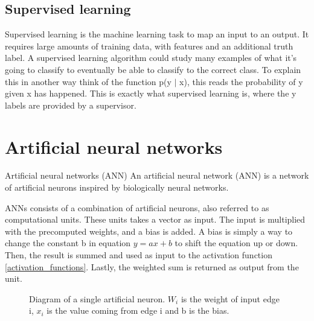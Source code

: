 \subsection{Supervised learning}
\label{supervised_learning}

Supervised learning is the machine learning task to map an input to an output. It requires large amounts of training data, with features and an additional truth label. 
A supervised learning algorithm could study many examples of what it's going to classify to eventually be able to classify to the correct class. To explain this in another way think of the function p(y $|$ x), this reads the probability of y given x has happened. This is exactly what supervised learning is, where the y labels are provided by a supervisor.

\section{Artificial neural networks}
\label{artificial_neural_networks}

Artificial neural networks (ANN) 
An artificial neural network (ANN) is a network of artificial neurons inspired by biologically neural networks.

ANNs consists of a combination of artificial neurons, also referred to as computational units. These units takes a vector as input. The input is multiplied with the precomputed weights, and a bias is added. A bias is simply a way to change the constant b in equation $y = ax + b$ to shift the equation up or down. Then, the result is summed and used as input to the activation function \ref{activation_functions}. Lastly, the weighted sum is returned as output from the unit. \cite{_cs231n_????} \cite{_multi-layer_????}

\begin{figure}[H]
  \centering
    \caption{Diagram of a single artificial neuron. $W_{i}$ is the weight of input edge i, $x_{i}$ is the value coming from edge i and b is the bias.} %
    \label{fig:single_neuron}

\end{figure}

